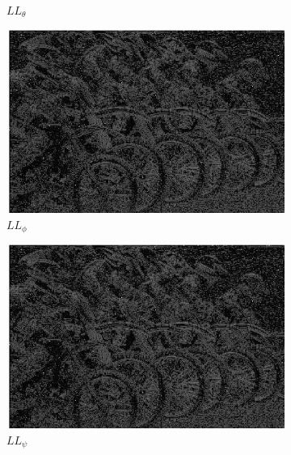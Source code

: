 \begin{figure}
\begin{subfigure}[b]{0.23\textwidth}
         \caption{$LL_{\theta}$}
         \label{fig:qwt2}
     \end{subfigure}
     \begin{subfigure}[b]{0.23\textwidth}
         \centering
         \includegraphics[width=\textwidth]{./figs/o_1_1_2_q}
         \caption{$LL_{\phi}$}
         \label{fig:qwt3}
     \end{subfigure}
     \begin{subfigure}[b]{0.23\textwidth}
         \centering
         \includegraphics[width=\textwidth]{./figs/o_1_1_2_q}
         \caption{$LL_{\psi}$}
         \label{fig:qwt4}
     \end{subfigure}
     \\
     \begin{subfigure}[b]{0.23\textwidth}
         \centering

\end{subfigure}
\end{figure}
